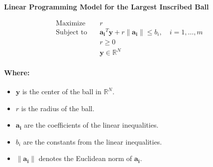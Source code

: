 \documentclass{article}
\begin{document}
\textbf{Linear Programming Model for the Largest Inscribed Ball}

\begin{align*}
\text{Maximize} \quad & r \\
\text{Subject to} \quad & \mathbf{a_i}^T \mathbf{y} + r \|\mathbf{a_i}\| \leq b_i, \quad i = 1, \ldots, m \\
& r \geq 0 \\
& \mathbf{y} \in \mathbb{R}^N
\end{align*}

\paragraph{Where:}
\begin{itemize}
    \item \(\mathbf{y}\) is the center of the ball in \(\mathbb{R}^N\).
    \item \(r\) is the radius of the ball.
    \item \(\mathbf{a_i}\) are the coefficients of the linear inequalities.
    \item \(b_i\) are the constants from the linear inequalities.
    \item \(\|\mathbf{a_i}\|\) denotes the Euclidean norm of \(\mathbf{a_i}\).
\end{itemize}
\end{document}
